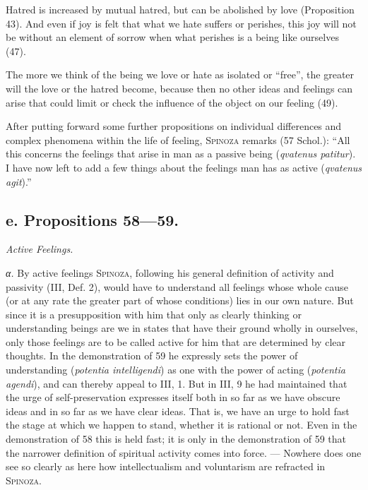 \documentclass[12pt]{article}
\newcommand{\opage}[1]{\marginnote{\footnotesize\textit{[#1]}}}
\begin{document}
Hatred is increased by mutual hatred, but can be abolished by love (Proposition 43). And even if
joy is felt that what we hate suffers or perishes, this joy will not be without an element of
sorrow when what perishes is a being like ourselves (47).

The more we think of the being we love or hate as isolated or ``free'', the greater will the love
or the hatred become, because then no other ideas and feelings can arise that could limit or check
the influence of the object on our feeling (49).

After putting forward some further propositions on individual differences and complex phenomena
within the life of feeling, \textsc{Spinoza} remarks (57 Schol.): ``All this concerns the feelings
that arise in man as a passive being (\textit{qvatenus patitur}). I have now left to add a few
things about the feelings man has as active (\textit{qvatenus agit}).'' %

\subsection*{e. Propositions 58---59.}
\begin{center}\textit{Active Feelings.}\end{center}

\textit{α.} By active feelings \textsc{Spinoza}, following his general definition of activity and
passivity (III, Def. 2), would have to understand all feelings whose whole cause (or at any rate
the greater part of whose conditions) lies in our own nature. But since it is a presupposition with
him that only as clearly thinking or understanding beings are we in states that have their ground
wholly in ourselves, only those feelings \opage{68}are to be called active for him that are
determined by clear thoughts. In the demonstration of 59 he expressly sets the power of
understanding (\textit{potentia intelligendi}) as one with the power of acting (\textit{potentia
agendi}), and can thereby appeal to III, 1. But in III, 9 he had maintained that the urge of
self-preservation expresses itself both in so far as we have obscure ideas and in so far as we have
clear ideas. That is, we have an urge to hold fast the stage at which we happen to stand, whether
it is rational or not. Even in the demonstration of 58 this is held fast; it is only in the
demonstration of 59 that the narrower definition of spiritual activity comes into force. ---
Nowhere does one see so clearly as here how intellectualism and voluntarism are refracted in
\textsc{Spinoza}.
\end{document}
